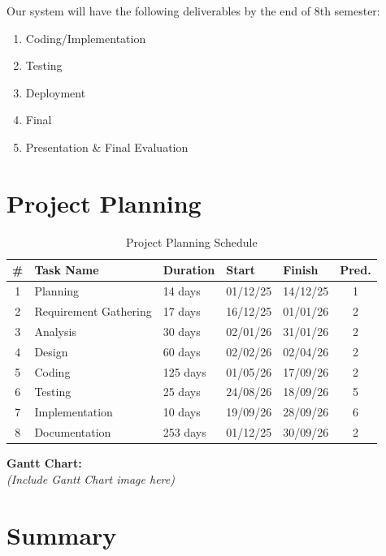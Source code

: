 \documentclass[12pt, a4paper, oneside]{report}
\begin{document}
Our system will have the following deliverables by the end of 8th semester:
\begin{enumerate}
    \item Coding/Implementation
    \item Testing
    \item Deployment
    \item Final
    \item Presentation \& Final Evaluation
\end{enumerate}

\section{Project Planning}
\label{sec:planning}

\begin{table}[H]
\centering
\caption{Project Planning Schedule}
\label{tab:planning}
\begin{tabular}{|c|l|l|l|l|c|}
\hline
\textbf{\#} & \textbf{Task Name} & \textbf{Duration} & \textbf{Start} & \textbf{Finish} & \textbf{Pred.} \\ \hline
1 & Planning & 14 days & 01/12/25 & 14/12/25 & 1 \\ \hline
2 & Requirement Gathering & 17 days & 16/12/25 & 01/01/26 & 2 \\ \hline
3 & Analysis & 30 days & 02/01/26 & 31/01/26 & 2 \\ \hline
4 & Design & 60 days & 02/02/26 & 02/04/26 & 2 \\ \hline
5 & Coding & 125 days & 01/05/26 & 17/09/26 & 2 \\ \hline
6 & Testing & 25 days & 24/08/26 & 18/09/26 & 5 \\ \hline
7 & Implementation & 10 days & 19/09/26 & 28/09/26 & 6 \\ \hline
8 & Documentation & 253 days & 01/12/25 & 30/09/26 & 2 \\ \hline
\end{tabular}
\end{table}

\textbf{Gantt Chart:}\\
\textit{(Include Gantt Chart image here)}\\

\section{Summary}
\label{sec:ch1-summary}
\end{document}
